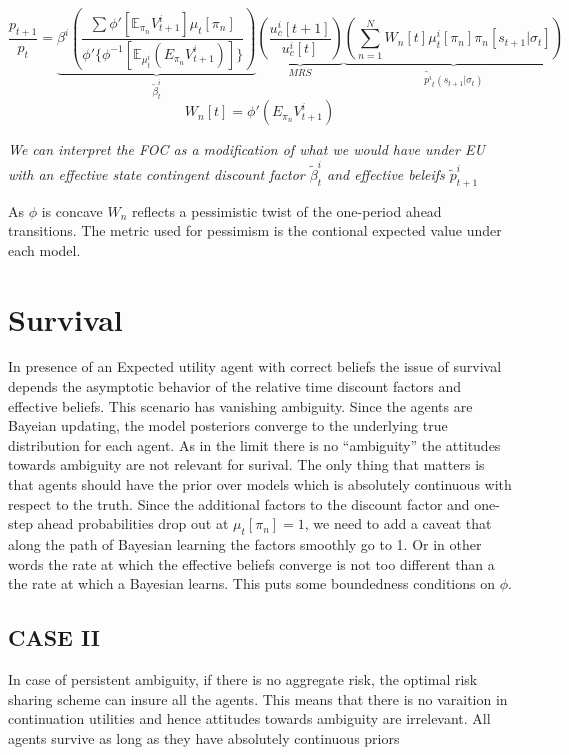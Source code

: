 \documentclass[12pt]{article}
\begin{document}
\[\frac{p_{t+1}}{p_t}=\underbrace{\beta^i\left(\frac{\sum \phi'[\mathbb{E}_{\pi_n}V^i_{t+1}]\mu_t[\pi_n]}{\phi'\{\phi^{-1}[\mathbb{E}_{\mu^i_t}(E_{\pi_n}V^i_{t+1})]\}}\right)}_{\tilde{\beta}^i_t}
\underbrace{\left(\frac{u^i_c[t+1]}{u^i_c[t]} \right)}_{MRS}
\underbrace{\left( \sum_{n=1}^{N}{W_n[t]\mu^i_t[\pi_n]\pi_n[s_{t+1}|\sigma_t]}\right)}_{\tilde{p^i}_t(s_{t+1}|\sigma_t)}\]
\[W_n[t]=\phi'(E_{\pi_n}V^i_{t+1})\]

\emph{We can interpret the FOC as a modification of what we would have under EU with an effective state contingent discount factor $\tilde{\beta}^i_t$ and effective beleifs $\tilde{p}^i_{t+1}$}

As $\phi$ is concave $W_n$ reflects a pessimistic twist of the one-period ahead transitions. The metric used for pessimism is the contional expected value under each model. 	
\section{Survival}
In presence of an Expected utility agent with correct beliefs the issue of survival depends the asymptotic behavior of the relative time discount factors and effective beliefs.
This scenario has vanishing ambiguity. Since the agents are Bayeian updating, the model posteriors converge to the underlying true distribution for each agent. As in the limit there is no ``ambiguity'' the attitudes towards ambiguity are not relevant for surival. The only thing that matters is that agents should have the prior over models which is absolutely continuous with respect to the truth. Since the additional factors to the discount factor and one-step ahead probabilities drop out at $\mu_t[\pi_n]= 1$, we need to add a caveat that along the path of Bayesian learning the factors smoothly go to 1. Or in other words the rate at which the effective beliefs converge is not too different than a the rate at which a Bayesian learns. This puts some boundedness conditions on $\phi$.
\subsection{CASE II}
In case of persistent ambiguity, if there is no aggregate risk, the optimal risk sharing scheme can insure all the agents. This means that there is no varaition in continuation utilities and hence attitudes towards ambiguity are irrelevant. All agents survive as long as they have absolutely continuous priors
\end{document}
